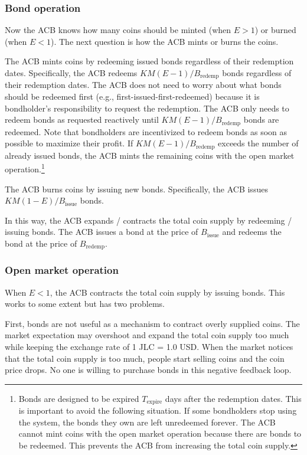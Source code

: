 \documentclass[dvipdfmx,a4paper]{article}
\begin{document}
\subsubsection{Bond operation}

Now the ACB knows how many coins should be minted (when $E>1$) or burned (when $E<1$). The next question is how the ACB mints or burns the coins.

The ACB mints coins by redeeming issued bonds regardless of their redemption dates. Specifically, the ACB redeems $KM(E-1)/B_{\mathrm{redemp}}$ bonds regardless of their redemption dates. The ACB does not need to worry about what bonds should be redeemed first (e.g., first-issued-first-redeemed) because it is bondholder's responsibility to request the redemption. The ACB only needs to redeem bonds as requested reactively until $KM(E-1)/B_{\mathrm{redemp}}$ bonds are redeemed. Note that bondholders are incentivized to redeem bonds as soon as possible to maximize their profit. If $KM(E-1)/B_{\mathrm{redemp}}$ exceeds the number of already issued bonds, the ACB mints the remaining coins with the open market operation.\footnote{Bonds are designed to be expired $T_{\mathrm{expire}}$ days after the redemption dates. This is important to avoid the following situation. If some bondholders stop using the system, the bonds they own are left unredeemed forever. The ACB cannot mint coins with the open market operation because there are bonds to be redeemed. This prevents the ACB from increasing the total coin supply.}

The ACB burns coins by issuing new bonds. Specifically, the ACB issues $KM(1-E)/B_{\mathrm{issue}}$ bonds.

In this way, the ACB expands / contracts the total coin supply by redeeming / issuing bonds. The ACB issues a bond at the price of $B_{\mathrm{issue}}$ and redeems the bond at the price of $B_{\mathrm{redemp}}$.

\subsubsection{Open market operation}

When $E<1$, the ACB contracts the total coin supply by issuing bonds. This works to some extent but has two problems.

First, bonds are not useful as a mechanism to contract overly supplied coins. The market expectation may overshoot and expand the total coin supply too much while keeping the exchange rate of 1 JLC = 1.0 USD. When the market notices that the total coin supply is too much, people start selling coins and the coin price drops. No one is willing to purchase bonds in this negative feedback loop.
\end{document}
